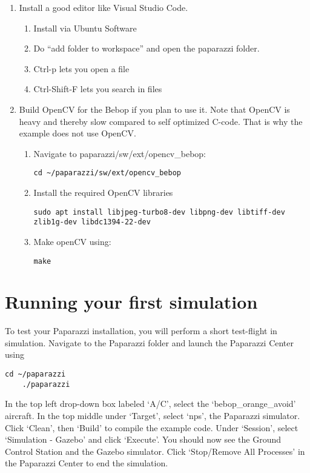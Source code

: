\begin{enumerate}
	\item Install a good editor like Visual Studio Code.
		
	\begin{enumerate}
		\item{Install via Ubuntu Software}
		\item{Do ``add folder to workspace'' and open the paparazzi folder.}
		\item{Ctrl-p lets you open a file}
		\item{Ctrl-Shift-F lets you search in files}
	\end{enumerate}
	
	\item Build OpenCV for the Bebop if you plan to use it. Note that OpenCV is heavy and thereby slow compared to self
	optimized C-code. That is why the example does not use OpenCV.

	\begin{enumerate}
		\item Navigate to paparazzi/sw/ext/opencv\_bebop:
		\begin{lstlisting}[style=Bash]
			cd ~/paparazzi/sw/ext/opencv_bebop
		\end{lstlisting}
		\item Install the required OpenCV libraries
		\begin{lstlisting}[style=Bash]
			sudo apt install libjpeg-turbo8-dev libpng-dev libtiff-dev zlib1g-dev libdc1394-22-dev
		\end{lstlisting}
		\item Make openCV using:
		\begin{lstlisting}[style=Bash]
			make
		\end{lstlisting}
	\end{enumerate}
\end{enumerate}


\section{Running your first simulation}
To test your Paparazzi installation, you will perform a short test-flight in simulation.
Navigate to the Paparazzi folder and launch the Paparazzi Center using

\begin{lstlisting}[style=Bash]
	cd ~/paparazzi
	./paparazzi
\end{lstlisting}

In the top left drop-down box labeled `A/C', select the `bebop\_orange\_avoid' aircraft.
In the top middle under `Target', select `nps', the Paparazzi simulator.
Click `Clean', then `Build' to compile the example code.
Under `Session', select `Simulation - Gazebo' and click `Execute'. You should now see the Ground Control Station and the Gazebo simulator.
Click `Stop/Remove All Processes' in the Paparazzi Center to end the simulation.

